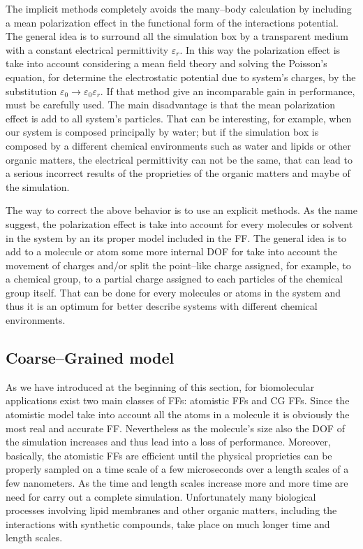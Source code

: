 The implicit methods completely avoids the many--body calculation by including a mean polarization effect in the functional form of the interactions potential. The general idea is to surround all the simulation box by a transparent medium with a constant electrical permittivity $\varepsilon_r$. In this way the polarization effect is take into account considering a mean field theory and solving the Poisson's equation, for determine the electrostatic potential due to system's charges, by the substitution $\varepsilon_0\rightarrow\varepsilon_0\varepsilon_r$. If that method give an incomparable gain in performance, must be carefully used. The main disadvantage is that the mean polarization effect is add to all system's particles. That can be interesting, for example, when our system is composed principally by water; but if the simulation box is composed by a different chemical environments such as water and lipids or other organic matters, the electrical permittivity can not be the same, that can lead to a serious incorrect results of the proprieties of the organic matters and maybe of the simulation.

The way to correct the above behavior is to use an explicit methods. As the name suggest, the polarization effect is take into account for every molecules or solvent in the system by an its proper model included in the \ac{FF}. The general idea is to add to a molecule or atom some more internal \ac{DOF} for take into account the movement of charges and/or split the point--like charge assigned, for example, to a chemical group, to a partial charge assigned to each particles of the chemical group itself. That can be done for every molecules or atoms in the system and thus it is an optimum for better describe systems with different chemical environments.

\subsection{Coarse--Grained model}
As we have introduced at the beginning of this section, for biomolecular applications exist two main classes of \acp{FF}: atomistic \acp{FF} and \ac{CG} \acp{FF}. Since the atomistic model take into account all the atoms in a molecule it is obviously the most real and accurate \ac{FF}. Nevertheless as the molecule's size also the \ac{DOF} of the simulation increases and thus lead into a loss of performance. Moreover, basically, the atomistic \acp{FF} are efficient until the physical proprieties can be properly sampled on a time scale of a few microseconds over a length scales of a few nanometers. As the time and length scales increase more and more time are need for carry out a complete simulation. Unfortunately many biological processes involving lipid membranes and other organic matters, including the interactions with synthetic compounds, take place on much longer time and length scales.

